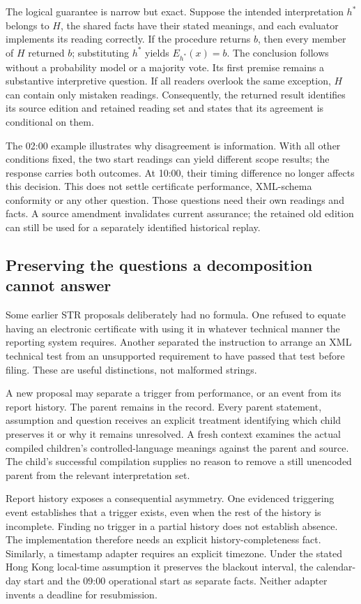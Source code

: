 \documentclass[12pt,a4paper,oneside,openany]{book}
\begin{document}
The logical guarantee is narrow but exact. Suppose the intended interpretation
$h^*$ belongs to $H$, the shared facts have their stated meanings, and each
evaluator implements its reading correctly. If the procedure returns $b$,
then every member of $H$ returned $b$; substituting $h^*$ yields
$E_{h^*}(x)=b$. The conclusion follows without a probability model or a majority
vote. Its first premise remains a substantive interpretive question. If all
readers overlook the same exception, $H$ can contain only mistaken readings.
Consequently, the returned result identifies its source edition and retained
reading set and states that its agreement is conditional on them.

The 02:00 example illustrates why disagreement is information. With all other
conditions fixed, the two start readings can yield different scope results;
the response carries both outcomes. At 10:00, their timing difference no longer
affects this decision. This does not settle certificate performance, XML-schema
conformity or any other question. Those questions need their own readings and
facts. A source amendment invalidates current assurance; the retained old
edition can still be used for a separately identified historical replay.

\subsection{Preserving the questions a decomposition cannot answer}

Some earlier STR proposals deliberately had no formula. One refused to equate
having an electronic certificate with using it in whatever technical manner
the reporting system requires. Another separated the instruction to arrange
an XML technical test from an unsupported requirement to have passed that
test before filing. These are useful distinctions, not malformed strings.

A new proposal may separate a trigger from performance, or an event from its
report history. The parent remains in the record. Every parent statement,
assumption and question receives an explicit treatment identifying which child
preserves it or why it remains unresolved. A fresh context examines the actual
compiled children's controlled-language meanings against the parent and source.
The child's successful compilation supplies no reason to remove a still
unencoded parent from the relevant interpretation set.

Report history exposes a consequential asymmetry. One evidenced triggering
event establishes that a trigger exists, even when the rest of the history is
incomplete. Finding no trigger in a partial history does not establish absence.
The implementation therefore needs an explicit history-completeness fact.
Similarly, a timestamp adapter requires an explicit timezone. Under the stated
Hong Kong local-time assumption it preserves the blackout interval, the
calendar-day start and the 09:00 operational start as separate facts. Neither
adapter invents a deadline for resubmission.
\end{document}
